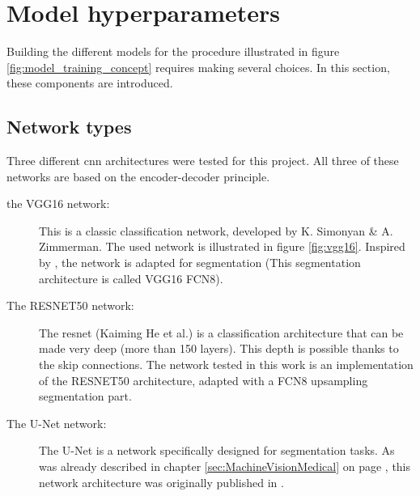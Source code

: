 \section{Model hyperparameters}

Building the different models for the procedure illustrated in figure \ref{fig:model_training_concept} requires making several choices.
In this section, these components are introduced.

\subsection{Network types\label{sec:network_types}}

Three different \acrlong{cnn} architectures were tested for this project.
All three of these networks are based on the encoder-decoder principle.

\begin{description}
    \item[the VGG16 network: ] This is a classic classification network, developed by K. Simonyan \& A. Zimmerman. 
    The used network is illustrated in figure \ref{fig:vgg16}. 
    Inspired by \cite{Laradji2020}, the network is adapted for segmentation (This segmentation architecture is called VGG16 FCN8).
    \item[The RESNET50 network:] The \Gls{resnet} (Kaiming He et al.) is a classification architecture that can be made very deep (more than 150 layers).
    This depth is possible thanks to the skip connections. The network tested in this work is an implementation of the RESNET50 architecture, adapted with a FCN8 upsampling segmentation part.
    \item[The U-Net network: ] The U-Net is a network specifically designed for segmentation tasks. As was already described in chapter \ref{sec:MachineVisionMedical} on page \pageref{sec:MachineVisionMedical}, this network architecture was originally published in \cite{Ronneberger2015}.
\end{description}

